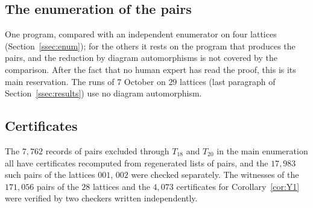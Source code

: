 \documentclass[11pt]{amsart}
\theoremstyle{definition}
\theoremstyle{remark}
\begin{document}
\subsection*{The enumeration of the pairs} One program, compared with an independent enumerator on four lattices
(Section~\ref{ssec:enum}); for the others it rests on the program that produces the pairs, and the reduction by diagram
automorphisms is not covered by the comparison. After the fact that no human expert has read the proof, this is its main
reservation. The runs of 7 October on $29$ lattices (last paragraph of Section~\ref{ssec:results}) use no diagram
automorphism.

\subsection*{Certificates} The $7{,}762$ records of pairs excluded through $T_{18}$ and $T_{20}$ in the main enumeration all have
certificates recomputed from regenerated lists of pairs, and the $17{,}983$ such pairs of the lattices $001$, $002$ were
checked separately. The witnesses of the $171{,}056$ pairs of the $28$ lattices and the $4{,}073$ certificates for
Corollary~\ref{cor:Y1} were verified by two checkers written independently.
\end{document}
